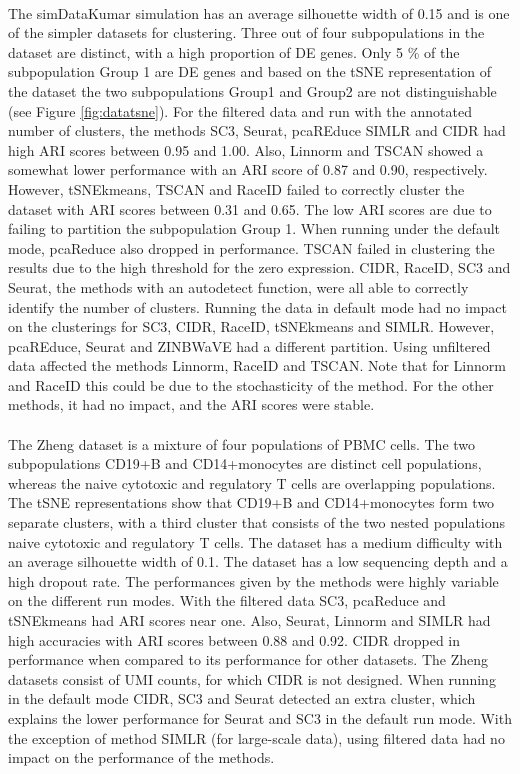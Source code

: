 \documentclass[12pt, a4paper]{article}\usepackage[]{graphicx}\usepackage[]{color}
\begin{document}
\paragraph{}
The simDataKumar simulation has an average silhouette width of 0.15 and is one of the simpler datasets for clustering. Three out of four subpopulations in the dataset are distinct, with a high proportion of DE genes. Only 5 \% of the subpopulation Group 1 are DE genes and based on the tSNE representation of the dataset the two subpopulations Group1 and Group2 are not distinguishable (see Figure \ref{fig:datatsne}). For the filtered data and run with the annotated number of clusters, the methods SC3, Seurat, pcaREduce SIMLR and CIDR had high ARI scores between 0.95 and 1.00. Also, Linnorm and TSCAN showed a somewhat lower performance with an ARI score of 0.87 and 0.90, respectively. However, tSNEkmeans, TSCAN and RaceID failed to correctly cluster the dataset with ARI scores between 0.31 and 0.65. The low ARI scores are due to failing to partition the subpopulation Group 1.
When running under the default mode, pcaReduce also dropped in performance. TSCAN failed in clustering the results due to the high threshold for the zero expression.
CIDR, RaceID, SC3 and Seurat, the methods with an autodetect function, were all able to correctly identify the number of clusters. Running the data in default mode had no impact on the clusterings for SC3, CIDR, RaceID, tSNEkmeans and SIMLR. However, pcaREduce, Seurat and ZINBWaVE had a different partition. Using unfiltered data affected the methods Linnorm, RaceID and TSCAN. Note that for Linnorm and RaceID this could be due to the stochasticity of the method. For the other methods, it had no impact, and the ARI scores were stable.
\paragraph{}

The Zheng dataset is a mixture of four populations of PBMC cells. The two subpopulations CD19+B and CD14+monocytes are distinct cell populations, whereas the naive cytotoxic and regulatory T cells are overlapping populations. The tSNE representations show that CD19+B and CD14+monocytes form two separate clusters, with a third cluster that consists of the two nested populations naive cytotoxic and regulatory T cells. The dataset has a medium difficulty with an average silhouette width of 0.1. The dataset has a low sequencing depth and a high dropout rate. 
The performances given by the methods were highly variable on the different run modes. With the filtered data SC3, pcaReduce and tSNEkmeans had ARI scores near one. Also, Seurat, Linnorm and SIMLR had high accuracies with ARI scores between 0.88 and 0.92. CIDR dropped in performance when compared to its performance for other datasets. The Zheng datasets consist of UMI counts, for which CIDR is not designed. 
When running in the default mode CIDR, SC3 and Seurat detected an extra cluster, which explains the lower performance for Seurat and SC3 in the default run mode. 
With the exception of method SIMLR (for large-scale data), using filtered data had no impact on the performance of the methods.
\end{document}
